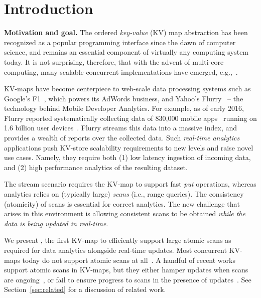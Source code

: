 \section{Introduction}
\label{sec:intro}

{\bf{Motivation and goal.}} The ordered \emph{key-value} (KV) map abstraction has been recognized as a popular programming interface
since the dawn of computer science, and remains an essential component of virtually any computing system today.
It is not surprising, therefore, that with the advent of multi-core computing,  many scalable concurrent
implementations have emerged,
e.g.,~\cite{JavaConcurrentSkipList,LinkedListBP,BraginskyP2012,Hendler04,Kogan12,NatarajanM2014}.

KV-maps have become centerpiece to web-scale data processing systems such as
Google's F1~\cite{Shute2013}, which powers its AdWords
business, and Yahoo's Flurry~\cite{flurry} --
the technology behind Mobile Developer Analytics.
For example,
as of early 2016,  Flurry  reported systematically collecting data of 830\!,000 mobile
apps~\cite{appmatrix}
running on 1.6 billion
user devices~\cite{phablet}.
Flurry streams  this data into a massive index, and provides
a wealth of reports over the collected data.
Such
\emph{real-time analytics}  applications push KV-store scalability requirements to new levels and raise novel use cases.
Namely, they require
both
(1) low latency ingestion of incoming data, and (2) high performance analytics of the resulting dataset.

The stream scenario requires the KV-map to support fast \emph{put} operations,
whereas  analytics  relies on (typically large) \emph{scans} (i.e., range queries).
The consistency (atomicity) of scans is essential for correct analytics.
The new challenge that arises in this environment is allowing consistent scans
to be obtained \emph{while the data is being updated in real-time}.

We present {\kiwi}, the first KV-map to efficiently support large atomic
scans as required for data analytics alongside real-time updates.
Most concurrent KV-maps today do not support atomic scans at all~\cite{JavaConcurrentSkipList,LinkedListBP,BraginskyP2012,Hendler04,NatarajanM2014,Kogan12,Lomet13,ArbelGHK15}.
A handful of recent works support atomic scans in KV-maps, but they either
hamper updates when scans are ongoing~\cite{BronsonCCO2010,Prokopec12},
or fail to ensure progress to scans in the presence of updates~\cite{BrownA12}.
See Section~\ref{sec:related} for a discussion of related work.

